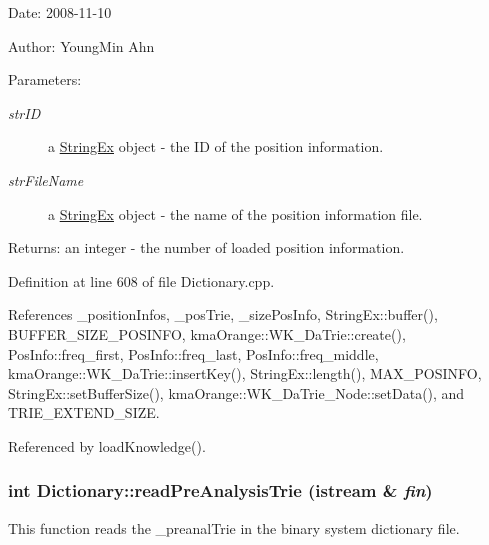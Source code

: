 \begin{Desc}
\item[Date:]2008-11-10 \end{Desc}
\begin{Desc}
\item[Author:]YoungMin Ahn \end{Desc}
\begin{Desc}
\item[Parameters:]
\begin{description}
\item[{\em strID}]a \hyperlink{classStringEx}{StringEx} object - the ID of the position information. \item[{\em strFileName}]a \hyperlink{classStringEx}{StringEx} object - the name of the position information file. \end{description}
\end{Desc}
\begin{Desc}
\item[Returns:]an integer - the number of loaded position information. \end{Desc}


Definition at line 608 of file Dictionary.cpp.

References \_\-positionInfos, \_\-posTrie, \_\-sizePosInfo, StringEx::buffer(), BUFFER\_\-SIZE\_\-POSINFO, kmaOrange::WK\_\-DaTrie::create(), PosInfo::freq\_\-first, PosInfo::freq\_\-last, PosInfo::freq\_\-middle, kmaOrange::WK\_\-DaTrie::insertKey(), StringEx::length(), MAX\_\-POSINFO, StringEx::setBufferSize(), kmaOrange::WK\_\-DaTrie\_\-Node::setData(), and TRIE\_\-EXTEND\_\-SIZE.

Referenced by loadKnowledge().\hypertarget{classkmaOrange_1_1Dictionary_f4ca7d3733a754e37e41559b64e424da}{
\subsubsection[{readPreAnalysisTrie}]{\setlength{\rightskip}{0pt plus 5cm}int Dictionary::readPreAnalysisTrie (istream \& {\em fin})}}
\label{classkmaOrange_1_1Dictionary_f4ca7d3733a754e37e41559b64e424da}


This function reads the \_\-preanalTrie in the binary system dictionary file. 

